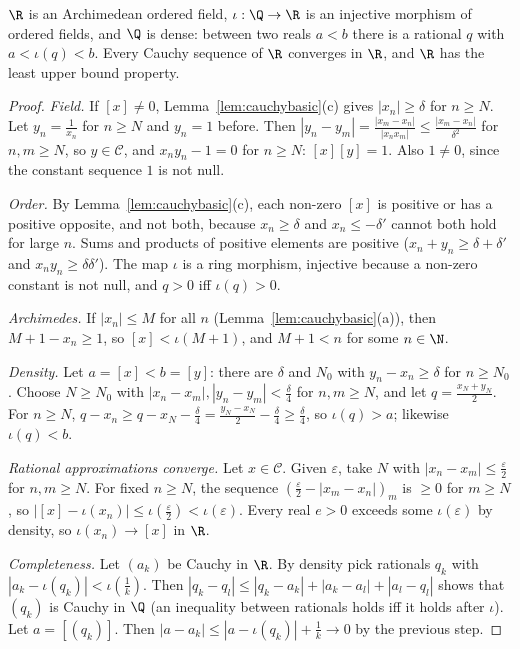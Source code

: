 \begin{theorem}\label{thm:reals}
$\R$ is an Archimedean ordered field, $\iota:\Q\to\R$ is an injective morphism of ordered fields, and $\Q$ is dense: between
two reals $a<b$ there is a rational $q$ with $a<\iota(q)<b$. Every Cauchy sequence of $\R$ converges in $\R$, and $\R$ has the least
upper bound property.
\end{theorem}
\begin{proof}
\emph{Field.} If $[x]\ne0$, Lemma~\ref{lem:cauchybasic}(c) gives $|x_n|\ge\delta$ for $n\ge N$. Let $y_n=\frac1{x_n}$ for $n\ge N$ and $y_n=1$ before.
Then $|y_n-y_m|=\frac{|x_m-x_n|}{|x_nx_m|}\le\frac{|x_m-x_n|}{\delta^2}$ for $n,m\ge N$, so $y\in\mathcal C$, and $x_ny_n-1=0$ for $n\ge N$: $[x][y]=1$. Also
$1\ne0$, since the constant sequence $1$ is not null.

\emph{Order.} By Lemma~\ref{lem:cauchybasic}(c), each non-zero $[x]$ is positive or has a positive opposite, and not both, because
$x_n\ge\delta$ and $x_n\le-\delta'$ cannot both hold for large $n$. Sums and products of positive elements are positive
($x_n+y_n\ge\delta+\delta'$ and $x_ny_n\ge\delta\delta'$). The map $\iota$ is a ring morphism, injective because a non-zero constant is not null, and $q>0$
iff $\iota(q)>0$.

\emph{Archimedes.} If $|x_n|\le M$ for all $n$ (Lemma~\ref{lem:cauchybasic}(a)), then $M+1-x_n\ge1$, so $[x]<\iota(M+1)$, and $M+1<n$ for some $n\in\N$.

\emph{Density.} Let $a=[x]<b=[y]$: there are $\delta$ and $N_0$ with $y_n-x_n\ge\delta$ for $n\ge N_0$. Choose $N\ge N_0$ with
$|x_n-x_m|,|y_n-y_m|<\frac\delta4$ for $n,m\ge N$, and let $q=\frac{x_N+y_N}2$. For $n\ge N$,
$q-x_n\ge q-x_N-\frac\delta4=\frac{y_N-x_N}2-\frac\delta4\ge\frac\delta4$, so $\iota(q)>a$; likewise $\iota(q)<b$.

\emph{Rational approximations converge.} Let $x\in\mathcal C$. Given $\varepsilon$, take $N$ with $|x_n-x_m|\le\frac\varepsilon2$ for $n,m\ge N$. For fixed $n\ge N$,
the sequence $(\frac\varepsilon2-|x_m-x_n|)_m$ is $\ge0$ for $m\ge N$, so $|[x]-\iota(x_n)|\le\iota(\frac\varepsilon2)<\iota(\varepsilon)$. Every real $e>0$ exceeds some
$\iota(\varepsilon)$ by density, so $\iota(x_n)\to[x]$ in $\R$.

\emph{Completeness.} Let $(a_k)$ be Cauchy in $\R$. By density pick rationals $q_k$ with $|a_k-\iota(q_k)|<\iota(\frac1k)$. Then
$|q_k-q_l|\le|q_k-a_k|+|a_k-a_l|+|a_l-q_l|$ shows that $(q_k)$ is Cauchy in $\Q$ (an inequality between rationals holds iff it holds after
$\iota$). Let $a=[(q_k)]$. Then $|a-a_k|\le|a-\iota(q_k)|+\frac1k\to0$ by the previous step.


\end{proof}
